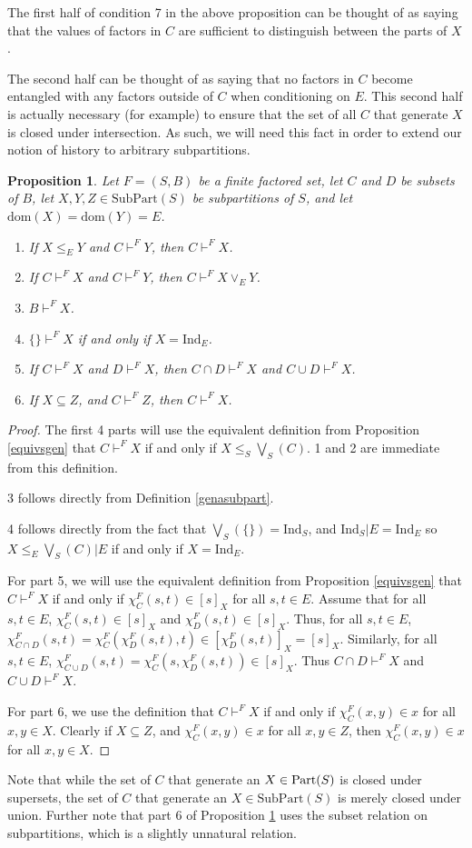 \documentclass[authordate,onecolumn]{miri-tech-article}
\newtheorem{proposition}{Proposition}
\begin{document}
The first half of condition 7 in the above proposition can be thought of as saying that the values of factors in $C$ are sufficient to distinguish between the parts of $X$.

The second half can be thought of as saying that no factors in $C$ become entangled with any factors outside of $C$ when conditioning on $E$. This second half is actually necessary (for example) to ensure that the set of all $C$ that generate $X$ is closed under intersection. As such, we will need this fact in order to extend our notion of history to arbitrary subpartitions.
\begin{proposition}\label{propsgen}
Let $F=(S,B)$ be a finite factored set, let $C$ and $D$ be subsets of $B$, let $X,Y,Z\in \text{SubPart}(S)$ be subpartitions of $S$, and let $\text{dom}(X)=\text{dom}(Y)=E$.
\begin{enumerate}
    \item If $X\leq_E Y$ and $C\vdash^F Y$, then $C\vdash^F X$.
    \item If $C\vdash^F X$ and $C\vdash^F Y$, then $C\vdash^F X\vee_E Y$.
    \item $B\vdash^F X$.
    \item $\{\}\vdash^F X$ if and only if $X=\text{Ind}_E$.
    \item If $C\vdash^F X$ and $D\vdash^F X$, then $C\cap D\vdash^F X$ and $C\cup D\vdash^F X$.
    \item If $X\subseteq Z$, and $C\vdash^F Z$, then $C\vdash^F X$.
\end{enumerate}
\end{proposition}
\begin{proof}
The first 4 parts will use the equivalent definition from Proposition \ref{equivsgen} that $C\vdash^F X$ if and only if $X\leq_S\bigvee_S(C)$. 1 and 2 are immediate from this definition.

3 follows directly from Definition \ref{genasubpart}. 

4 follows directly from the fact that $\bigvee_S(\{\})=\text{Ind}_S$, and $\text{Ind}_S|E=\text{Ind}_E$ so $X\leq_E\bigvee_S(C)|E$ if and only if $X=\text{Ind}_E$.

For part 5, we will use the equivalent definition from Proposition \ref{equivsgen} that $C\vdash^F X$ if and only if $\chi^F_C(s,t)\in [s]_X$ for all $s,t\in E$. Assume that for all $s,t\in E$, $\chi^F_C(s,t)\in [s]_X$ and $\chi^F_D(s,t)\in [s]_X$. Thus, for all $s,t\in E$, $\chi^F_{C\cap D}(s,t)=\chi^F_C(\chi^F_D(s,t),t)\in [\chi^F_D(s,t)]_X=[s]_X$. Similarly, for all $s,t\in E$, $\chi^F_{C\cup D}(s,t)=\chi^F_C(s,\chi^F_D(s,t))\in[s]_X$. Thus $C\cap D\vdash^F X$ and $C\cup D\vdash^F X$.

For part 6, we use the definition that $C\vdash^F X$ if and only if $\chi^F_C(x,y)\in x$ for all $x,y\in X$. Clearly if $X\subseteq Z$, and $\chi^F_C(x,y)\in x$ for all $x,y\in Z$, then $\chi^F_C(x,y)\in x$ for all $x,y\in X$.
\end{proof}
Note that while the set of $C$ that generate an $X\in \text{Part}(S)$ is closed under supersets, the set of $C$ that generate an $X\in \text{SubPart}(S)$ is merely closed under union. Further note that part 6 of Proposition \ref{propsgen} uses the subset relation on subpartitions, which is a slightly unnatural relation.
    
\end{document}
